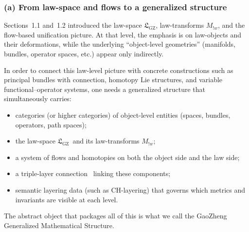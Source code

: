 \documentclass[11pt]{book}
\theoremstyle{plain}
\theoremstyle{definition}
\newcommand{\GZLS}{\ensuremath{\mathfrak{L}_{\mathrm{GZ}}}}       \newcommand{\GZLT}{\ensuremath{M_{!w}}}                           \newcommand{\GZLOC}{\ensuremath{A_M}}                             \newcommand{\GZLCurv}{\ensuremath{\mathcal{F}_{\mathrm{law}}}}
\begin{document}
\subsubsection*{(a) From law-space and flows to a generalized structure}

Sections~1.1 and~1.2 introduced the law-space \GZLS, law-transforms
\GZLT, and the flow-based unification picture. At that level, the
emphasis is on law-objects and their deformations, while the
underlying “object-level geometries” (manifolds, bundles, operator
spaces, etc.) appear only indirectly.

In order to connect this law-level picture with concrete constructions
such as principal bundles with connection, homotopy Lie structures,
and variable functional–operator systems, one needs a generalized
structure that simultaneously carries:



\begin{itemize}
  \item categories (or higher categories) of object-level entities
        (spaces, bundles, operators, path spaces);
  \item the law-space \GZLS\ and its law-transforms \GZLT;
  \item a system of flows and homotopies on both the object side and
        the law side;
  \item a triple-layer connection \GZTLC\ linking these components;
  \item semantic layering data (such as CH-layering) that governs
        which metrics and invariants are visible at each level.
\end{itemize}

The abstract object that packages all of this is what we call the
GaoZheng Generalized Mathematical Structure.
\end{document}
